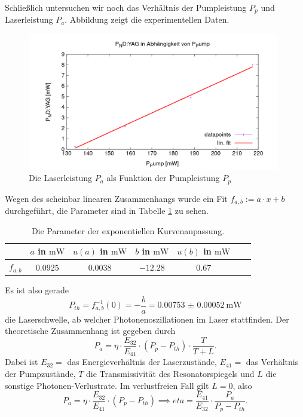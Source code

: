 \documentclass[../../../main.tex]{subfiles}
\begin{document}
    Schließlich untersuchen wir noch das Verhältnis der Pumpleistung $P_p$ und Laserleistung $P_a$. Abbildung zeigt die experimentellen Daten.

    \begin{figure}[H]
        \centering
        \includegraphics[width=11cm]{../../Bilddateien/5/P(NDYAG)overP(Pump).png}
        \caption{Die Laserleistung $P_a$ als Funktion der Pumpleistung $P_p$}
        \label{fig:PumpLaserLeistung}
    \end{figure}

    Wegen des scheinbar linearen Zusammenhangs wurde ein Fit $f_{a,b} := a\cdot x + b$ durchgeführt, die Parameter sind in Tabelle \ref{tab:PumpLaserLeistungFitParameter} zu sehen.

    \begin{table}[H]
        \centering
        \begin{tabular}{c|cc|cc|cc}
            \hline
             & $a$ in $\si{\m\W}$ & $u(a)$ in $\si{\m\W}$ & $b$ in $\si{\m\W}$ & $u(b)$ in $\si{\m\W}$ \\
            \hline\hline
            $f_{a, b}$ & $0.0925$ & $0.0038$ & $-12.28$ & $0.67$\\
            \hline
        \end{tabular}
        \caption{Die Parameter der exponentiellen Kurvenanpassung.}
        \label{tab:PumpLaserLeistungFitParameter}
    \end{table}

    Es ist also gerade
    \[
        P_{th} = f^{-1}_{a, b}(0) = -\frac{b}{a} = \SI{0.00753(52)}{\m\W}
    \]
    die Laserschwelle, ab welcher Photonenoszillationen im Laser stattfinden. Der theoretische Zusammenhang ist gegeben durch 
    \[
        P_a = \eta\cdot\frac{E_{32}}{E_{41}}\cdot(P_p - P_{th})\cdot \frac{T}{T + L}.
    \]
    Dabei ist $E_{32} = $ das Energieverhältnis der Laserzustände, $E_{41}=$ das Verhältnis der Pumpzustände, $T$ die Transmissivität des Resonatorspiegels und $L$ die sonstige Photonen-Verlustrate. Im verlustfreien Fall gilt $L=0$, also 
    \[
        P_a = \eta\cdot\frac{E_{32}}{E_{41}}\cdot(P_p - P_{th}) \implies eta = \frac{E_{41}}{E_{32}}\cdot \frac{P_a}{P_p - P_{th}}.
    \] 
\end{document}
